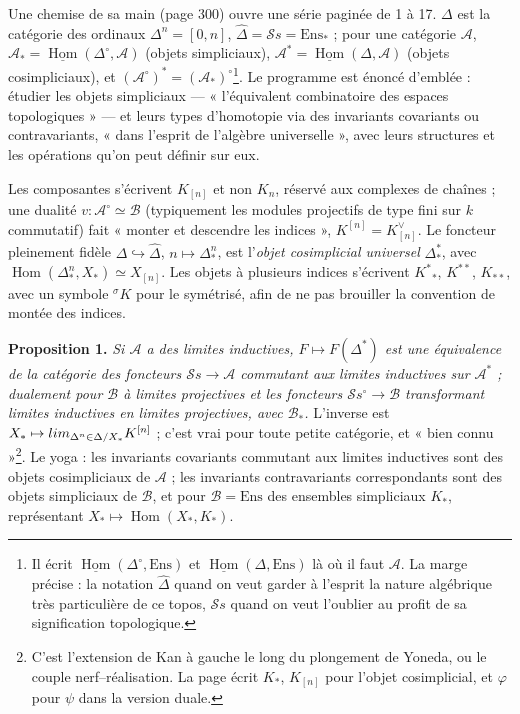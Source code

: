 \documentclass[11pt,a4paper]{article}
\begin{document}
Une chemise de sa main (page 300) ouvre une série paginée de 1 à 17.
$\Delta$ est la catégorie des ordinaux $\Delta^n = [0,n]$, $\widehat{\Delta} =
\mathcal{S}s = \mathrm{Ens}_*$ ; pour une catégorie $\mathcal{A}$, $\mathcal{A}_*
= \underline{\operatorname{Hom}}(\Delta^\circ, \mathcal{A})$ (objets simpliciaux),
$\mathcal{A}^* = \underline{\operatorname{Hom}}(\Delta, \mathcal{A})$ (objets
cosimpliciaux), et $(\mathcal{A}^\circ)^* = (\mathcal{A}_*)^\circ$\footnote{Il
écrit $\underline{\operatorname{Hom}}(\Delta^\circ, \mathrm{Ens})$ et
$\underline{\operatorname{Hom}}(\Delta, \mathrm{Ens})$ là où il faut
$\mathcal{A}$. La marge précise : la notation $\widehat{\Delta}$ quand on veut
garder à l'esprit la nature algébrique très particulière de ce topos,
$\mathcal{S}s$ quand on veut l'oublier au profit de sa signification
topologique.}. Le programme est énoncé d'emblée : étudier les objets
simpliciaux — « l'équivalent combinatoire des espaces topologiques » — et leurs
types d'homotopie via des invariants covariants ou contravariants, « dans
l'esprit de l'algèbre universelle », avec leurs structures et les opérations
qu'on peut définir sur eux.

Les composantes s'écrivent $K_{[n]}$ et non $K_n$, réservé aux complexes de
chaînes ; une dualité $v : \mathcal{A}^\circ \simeq \mathcal{B}$ (typiquement les
modules projectifs de type fini sur $k$ commutatif) fait « monter et
descendre les indices », $K^{[n]} = K_{[n]}^\vee$. Le foncteur pleinement fidèle
$\Delta \hookrightarrow \widehat{\Delta}$, $n \mapsto \Delta^n_*$, est l'\emph{objet
cosimplicial universel} $\Delta^*_*$, avec $\operatorname{Hom}(\Delta^n_*, X_*)
\simeq X_{[n]}$. Les objets à plusieurs indices s'écrivent $K^*{}_*$, $K^{**}$,
$K_{**}$, avec un symbole ${}^\sigma K$ pour le symétrisé, afin de ne pas
brouiller la convention de montée des indices.

\textbf{Proposition 1.} \emph{Si $\mathcal{A}$ a des limites inductives,
$F \mapsto F(\Delta^*)$ est une équivalence de la catégorie des foncteurs
$\mathcal{S}s \to \mathcal{A}$ commutant aux limites inductives sur
$\mathcal{A}^*$ ; dualement pour $\mathcal{B}$ à limites projectives et les
foncteurs $\mathcal{S}s^\circ \to \mathcal{B}$ transformant limites inductives
en limites projectives, avec $\mathcal{B}_*$.} L'inverse est $X_* \mapsto
\varinjlim_{\Delta^n \in \Delta/X_*} K^{[n]}$ ; c'est vrai pour toute petite
catégorie, et « bien connu »\footnote{C'est l'extension de Kan à gauche le long
du plongement de Yoneda, ou le couple nerf–réalisation. La page écrit $K_*$,
$K_{[n]}$ pour l'objet cosimplicial, et $\varphi$ pour $\psi$ dans la version
duale.}. Le yoga : les invariants covariants commutant aux limites inductives
sont des objets cosimpliciaux de $\mathcal{A}$ ; les invariants contravariants
correspondants sont des objets simpliciaux de $\mathcal{B}$, et pour
$\mathcal{B} = \mathrm{Ens}$ des ensembles simpliciaux $K_*$, représentant $X_*
\mapsto \operatorname{Hom}(X_*, K_*)$.
\end{document}
